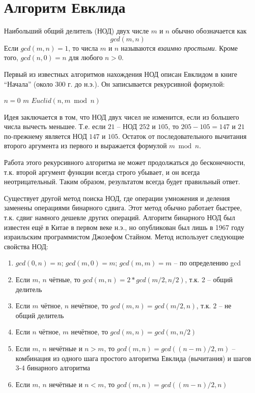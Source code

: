 \documentclass[a4paper,11pt]{article}
\begin{document}
\section{Алгоритм Евклида}
Наибольший общий делитель (НОД) двух числе $m$ и $n$ обычно обозначается как
\begin{equation*}
  gcd(m, n)
\end{equation*}
Если $gcd(m, n) = 1$, то числа $m$ и $n$ называются \emph{взаимно простыми}.
Кроме того, $gcd(n, 0) = n$ для любого $n > 0$.

Первый из известных алгоритмов нахождения НОД описан Евклидом в книге 
``Начала'' (около 300 г. до н.э.). Он записывается рекурсивной формулой:
\begin{codebox}
  \li \If $n = 0$
  \li \Then \Return $m$
  \li \Else \Return $Euclid(n, m \bmod n)$
      \End
\end{codebox}

Идея заключается в том, что НОД двух чисел не изменится, если из большего числа
вычесть меньшее. Т.е. если $21$ -- НОД $252$ и $105$, то $205-105 = 147$ и
$21$ по-прежнему является НОД $147$ и $105$. Остаток от последовательного 
вычитания второго аргумента из первого и выражается формулой $m \bmod n$.

Работа этого рекурсивного алгоритма не может продолжаться до бесконечности,
т.к. второй аргумент функции всегда строго убывает, и он всегда неотрицательный.
Таким образом, результатом всегда будет правильный ответ.

Существует другой метод поиска НОД, где операции умножения и деления заменены
операциями бинарного сдвига. Этот метод обычно работает быстрее, т.к. сдвиг
намного дешевле других операций. Алгоритм бинарного НОД был известен ещё в
Китае в первом веке н.э., но опубликован был лишь в 1967 году израильским 
программистом Джозефом Стайном. Метод использует следующие свойства НОД:

\begin{enumerate}
\item $gcd(0, n) = n$; $gcd(m, 0) = m$; $gcd(m, m) = m$ -- по определению gcd
\item Если $m$, $n$ чётные, то $gcd(m, n) = 2*gcd(m/2, n/2)$, т.к. 2 -- общий 
  делитель
\item Если $m$ чётное, $n$ нечётное, то $gcd(m, n) = gcd(m/2, n)$, т.к. 2 -- не
  общий делитель
\item Если $n$ чётное, $m$ нечётное, то $gcd(m, n) = gcd(m, n/2)$
\item Если $m$, $n$ нечётные и $n > m$, то $gcd(m, n) = gcd((n - m)/2, m)$ -- 
  комбинация из одного шага простого алгоритма Евклида (вычитания) и шагов 3-4
  бинарного алгоритма
\item Если $m$, $n$ нечётные и $n < m$, то $gcd(m, n) = gcd((m - n)/2, n)$
\end{enumerate}
\end{document}
